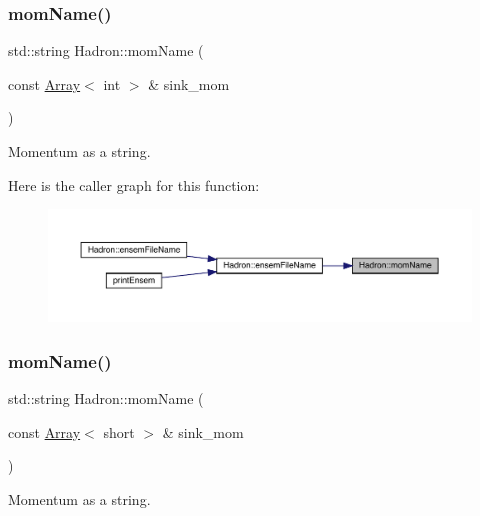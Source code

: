 \subsubsection{\texorpdfstring{momName()}{momName()}\hspace{0.1cm}{\footnotesize\ttfamily [1/2]}}
{\footnotesize\ttfamily std\+::string Hadron\+::mom\+Name (\begin{DoxyParamCaption}\item[{const \mbox{\hyperlink{classXMLArray_1_1Array}{Array}}$<$ int $>$ \&}]{sink\+\_\+mom }\end{DoxyParamCaption})}



Momentum as a string. 

Here is the caller graph for this function\+:
\nopagebreak
\begin{figure}[H]
\begin{center}
\leavevmode
\includegraphics[width=350pt]{d1/daf/namespaceHadron_ad1ac646aa2d410cc55e4b11c925867a6_icgraph}
\end{center}
\end{figure}
\mbox{\label{namespaceHadron_aaac56034a899893bfbd130cdd0427018}} 
\subsubsection{\texorpdfstring{momName()}{momName()}\hspace{0.1cm}{\footnotesize\ttfamily [2/2]}}
{\footnotesize\ttfamily std\+::string Hadron\+::mom\+Name (\begin{DoxyParamCaption}\item[{const \mbox{\hyperlink{classXMLArray_1_1Array}{Array}}$<$ short $>$ \&}]{sink\+\_\+mom }\end{DoxyParamCaption})}



Momentum as a string. 

\mbox{\label{namespaceHadron_afc213211f9c79372b449aac381596d1c}} 
